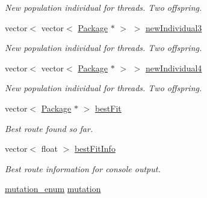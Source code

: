\begin{DoxyCompactItemize}
\begin{DoxyCompactList}\small\item\em New population individual for threads. Two offspring. \end{DoxyCompactList}\item 
vector$<$ vector$<$ \hyperlink{classPackage}{Package} $\ast$ $>$ $>$ \hyperlink{classGenetic_a273a3a800c8b20ba2bb1f9fe5a2bcde5}{new\+Individual3}\hypertarget{classGenetic_a273a3a800c8b20ba2bb1f9fe5a2bcde5}{}\label{classGenetic_a273a3a800c8b20ba2bb1f9fe5a2bcde5}

\begin{DoxyCompactList}\small\item\em New population individual for threads. Two offspring. \end{DoxyCompactList}\item 
vector$<$ vector$<$ \hyperlink{classPackage}{Package} $\ast$ $>$ $>$ \hyperlink{classGenetic_ae25379d1f5a925fc047ab259cb23e41b}{new\+Individual4}\hypertarget{classGenetic_ae25379d1f5a925fc047ab259cb23e41b}{}\label{classGenetic_ae25379d1f5a925fc047ab259cb23e41b}

\begin{DoxyCompactList}\small\item\em New population individual for threads. Two offspring. \end{DoxyCompactList}\item 
vector$<$ \hyperlink{classPackage}{Package} $\ast$ $>$ \hyperlink{classGenetic_aed33dd7cc9ad031cea96fc8cc1151b56}{best\+Fit}\hypertarget{classGenetic_aed33dd7cc9ad031cea96fc8cc1151b56}{}\label{classGenetic_aed33dd7cc9ad031cea96fc8cc1151b56}

\begin{DoxyCompactList}\small\item\em Best route found so far. \end{DoxyCompactList}\item 
vector$<$ float $>$ \hyperlink{classGenetic_a83f170993b9192d7dc78b7eede22a131}{best\+Fit\+Info}\hypertarget{classGenetic_a83f170993b9192d7dc78b7eede22a131}{}\label{classGenetic_a83f170993b9192d7dc78b7eede22a131}

\begin{DoxyCompactList}\small\item\em Best route information for console output. \end{DoxyCompactList}\item 
\hyperlink{structmutation__enum}{mutation\+\_\+enum} \hyperlink{classGenetic_ac00a7d48d29e825d08bb366b04ffb66a}{mutation}\hypertarget{classGenetic_ac00a7d48d29e825d08bb366b04ffb66a}{}\label{classGenetic_ac00a7d48d29e825d08bb366b04ffb66a}


\end{DoxyCompactItemize}
